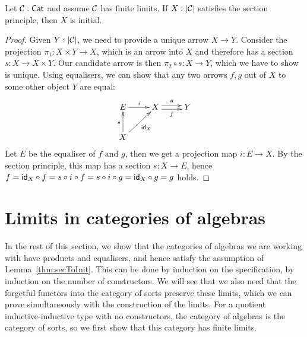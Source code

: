 \begin{lemma}
\label{thm:secToInit}
  Let $\mathcal{C}: \mathsf{Cat}$ and assume $\mathcal{C}$ has finite limits. If $X : | \mathcal{C} |$
  satisfies the section principle, then $X$ is initial.
\end{lemma}
\begin{proof}
  Given $Y : |\mathcal{C}|$, we need to provide a unique arrow $X \to
  Y$. Consider the projection $\pi_1 : X \times Y \to X$, which is an
  arrow into $X$ and therefore has a section $s : X \to X \times
  Y$. Our candidate arrow is then $\pi_2 \circ s : X \to Y$, which we
  have to show is unique. Using equalisers, we can show that any two
  arrows $f,g$ out of $X$ to some other object $Y$ are equal:
\[
\xymatrix{
E \ar[r]^{i} &X \ar@<-.5ex>[r]_-{f} \ar@<.5ex>[r]^-{g} &Y \\
X \ar[u]^{s} \ar[ur]_{\id_{X}}
}
\]
Let $E$ be the equaliser of $f$ and $g$, then we get a projection map
$i : E \to X$. By the section principle, this map has a section
$s : X \to E$, hence
$f = \mathsf{id}_X \circ f = s \circ i \circ f = s \circ i \circ g = \mathsf{id}_X
\circ g = g$ holds.
\end{proof}

\section{Limits in categories of algebras}

In the rest of this section, we show that the categories of algebras
we are working with have products and equalisers, and hence satisfy
the assumption of Lemma~\ref{thm:secToInit}.  This can be done by
induction on the specification, \ie by induction on the number of
constructors. We will see that we also need that the forgetful
functors into the category of sorts preserve these limits, which we
can prove simultaneously with the construction of the limits.  For a
quotient inductive-inductive type with no constructors, the category
of algebras is the category of sorts, so we first show that this
category has finite limits.

